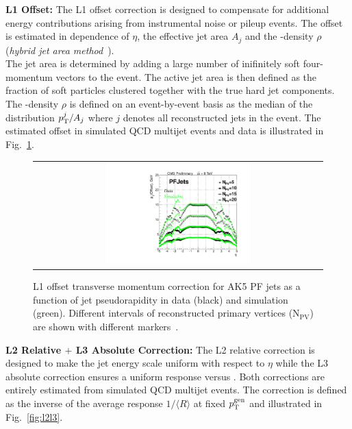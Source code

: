\begin{description}
 \item \textbf{L1 Offset:} The L1 offset correction is designed to compensate for additional energy contributions arising from instrumental noise or pileup events. The \pt offset is estimated in dependence of $\eta$, the effective jet area $A_j$ and the \pt-density $\rho$ (\textit{hybrid jet area method}~\cite{Cacciari2008119}). \\
The jet area is determined by adding a large number of inifinitely soft four-momentum vectors to the event. The active jet area is then defined as the fraction of soft particles clustered together with the true hard jet components. The \pt-density $\rho$ is defined on an event-by-event basis as the median of the distribution $p_{\text{T}}^{j}/A_{j}$ where $j$ denotes all reconstructed jets in the event. The estimated offset in simulated QCD multijet events and data is illustrated in Fig.~\ref{fig:l1offset}.
\begin{figure}[!h]
  \centering 
  \begin{tabular}{c}
    \includegraphics[width=0.51\textwidth]{figures/OffsetVsEta_NPV_PF5_data53_vs_mc53.pdf} 
  \end{tabular}
  \caption{L1 offset transverse momentum correction for AK5 PF jets as a function of jet pseudorapidity in data (black) and simulation (green). Different intervals of reconstructed primary vertices ($\mathrm{N_{PV}}$) are shown with different markers~\cite{CMS-DP-2013-033}.}
  \label{fig:l1offset}
\end{figure}
 \item \textbf{L2 Relative $+$ L3 Absolute Correction:} The L2 relative correction is designed to make the jet energy scale uniform with respect to $\eta$ while the L3 absolute correction ensures a uniform response versus \pt. Both corrections are entirely estimated from simulated QCD multijet events. The correction is defined as the inverse of the average response $1/\langle R \rangle$ at fixed $p_{\text{T}}^\mathrm{gen}$ and illustrated in Fig.~\ref{fig:l2l3}.
\begin{figure}[!h]

\end{figure}
\end{description}
